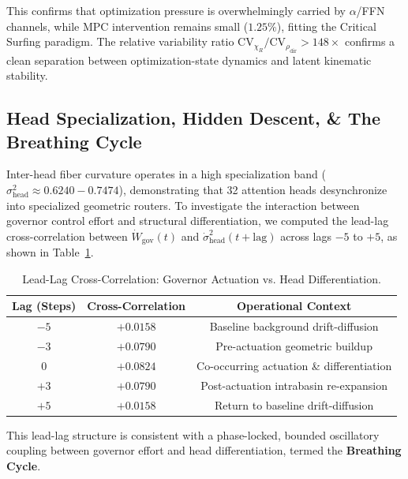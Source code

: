 \documentclass[11pt,twocolumn]{article}
\begin{document}
This confirms that optimization pressure is overwhelmingly carried by $\alpha$/FFN channels, while MPC intervention remains small ($1.25\%$), fitting the Critical Surfing paradigm. The relative variability ratio $\text{CV}_{\chi_R} / \text{CV}_{\rho_{\mathrm{dir}}} > 148\times$ confirms a clean separation between optimization-state dynamics and latent kinematic stability.

\subsection{Head Specialization, Hidden Descent, \& The Breathing Cycle}
Inter-head fiber curvature operates in a high specialization band ($\sigma^2_{\mathrm{head}} \approx 0.6240 - 0.7474$), demonstrating that 32 attention heads desynchronize into specialized geometric routers. To investigate the interaction between governor control effort and structural differentiation, we computed the lead-lag cross-correlation between $\dot{W}_{\mathrm{gov}}(t)$ and $\dot{\sigma}^2_{\mathrm{head}}(t + \text{lag})$ across lags $-5$ to $+5$, as shown in Table~\ref{tab:leadlag}.

\begin{table}[t]
\centering
\caption{Lead-Lag Cross-Correlation: Governor Actuation vs. Head Differentiation.}
\label{tab:leadlag}
\small
\begin{tabular}{ccc}
\toprule
\textbf{Lag (Steps)} & \textbf{Cross-Correlation} & \textbf{Operational Context} \\
\midrule
$-5$ & $+0.0158$ & Baseline background drift-diffusion \\
$-3$ & $+0.0790$ & Pre-actuation geometric buildup \\
$0$ & $+0.0824$ & Co-occurring actuation \& differentiation \\
$+3$ & $+0.0790$ & Post-actuation intrabasin re-expansion \\
$+5$ & $+0.0158$ & Return to baseline drift-diffusion \\
\bottomrule
\end{tabular}
\end{table}

This lead-lag structure is consistent with a phase-locked, bounded oscillatory coupling between governor effort and head differentiation, termed the \textbf{Breathing Cycle}.
\end{document}
